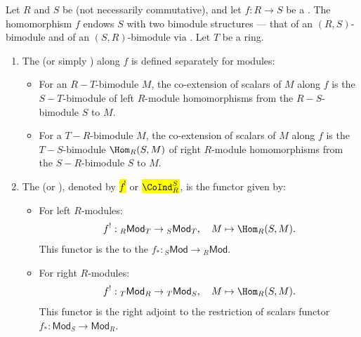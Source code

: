 \begin{definition} \label{definition:coextension_coinduction_of_scalars_of_modules_along_a_ring_homomorphism}
Let $R$ and $S$ be  (not necessarily commutative), and let $f: R \to S$ be a . The homomorphism $f$ endows $S$ with two bimodule structures --- that of an $(R, S)$-bimodule and of an $(S,R)$-bimodule via . Let $T$ be a ring.
\begin{enumerate}
    \item 

    The  (or simply ) along $f$ is defined separately for modules:
    \begin{itemize}
        \item For an $R-T$-bimodule $M$, the co-extension of scalars of $M$ along $f$ is the $S-T$-bimodule  of left $R$-module homomorphisms from the $R-S$-bimodule $S$ to $M$. 
        
        \item For a $T-R$-bimodule $M$, the co-extension of scalars of $M$ along $f$ is the $T-S$-bimodule $\Hom_R(S, M)$ of right $R$-module homomorphisms from the $S-R$-bimodule $S$ to $M$. 
    \end{itemize}

    \item The  (or ), denoted by \hl{$f^!$} or \hl{$\CoInd_R^S$}, is the functor given by:
    \begin{itemize}
        \item For left $R$-modules:
        $$f^!: {}_R\mathsf{Mod}_T \to {}_S\mathsf{Mod}_T, \quad M \mapsto \Hom_R(S, M).$$
        This functor is the  to the  $f_*: {}_S\mathsf{Mod} \to {}_R\mathsf{Mod}$.
        
        \item For right $R$-modules:
        $$f^!: {}_T \mathsf{Mod}_R \to {}_T \mathsf{Mod}_S, \quad M \mapsto \Hom_R(S, M).$$
        This functor is the right adjoint to the restriction of scalars functor $f_*: \mathsf{Mod}_S \to \mathsf{Mod}_R$.
    \end{itemize}
\end{enumerate}

\end{definition}